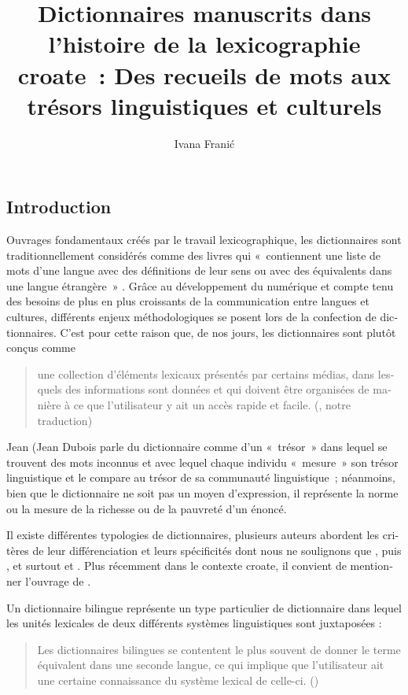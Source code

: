 \documentclass[output=paper,colorlinks,citecolor=brown,arabicfont,chinesefont,booklanguage=french]{langscibook}
\author{Ivana Franić \affiliation{University of Zagreb, Croatia }}
\title[Dictionnaires manuscrits dans l’histoire de la lexicographie croate]
      {Dictionnaires manuscrits dans l’histoire de la lexicographie croate~: Des recueils de mots aux trésors linguistiques et culturels}
\begin{document}
 
\begin{otherlanguage}{french}
\maketitle

\section{Introduction}
Ouvrages fondamentaux créés par le travail lexicographique, les dictionnaires sont traditionnellement considérés comme des livres qui «~contiennent une liste de mots d’une langue avec des définitions de leur sens ou avec des équivalents dans une langue étrangère~» \citep[10]{Samardzija2019}. Grâce au développement du numérique et compte tenu des besoins de plus en plus croissants de la communication entre langues et cultures, différents enjeux méthodologiques se posent lors de la confection de dictionnaires. C’est pour cette raison que, de nos jours, les dictionnaires sont plutôt conçus comme 

\begin{quote}
    une collection d’éléments lexicaux présentés par certains médias, dans lesquels des informations sont données et qui doivent être organisées de manière à ce que l’utilisateur y ait un accès rapide et facile. (\citealt[11]{Samardzija2019}, notre traduction)
\end{quote}

Jean (\citealt[44]{Dubois1970}Jean Dubois parle du dictionnaire comme d’un «~trésor~» dans lequel se trouvent des mots inconnus et avec lequel chaque individu «~mesure~» son trésor linguistique et le compare au trésor de sa communauté linguistique~; néanmoins, bien que le dictionnaire ne soit pas un moyen d’expression, il représente la norme ou la mesure de la richesse ou de la pauvreté d’un énoncé. 

Il existe différentes typologies de dictionnaires, plusieurs auteurs abordent les critères de leur différenciation et leurs spécificités dont nous ne soulignons que \citet{Zgusta1971}, puis \citet{Landau2001}, \citet{Dubois1970} et surtout \citet{Rey2008} et \citet{Pruvost2021}. Plus récemment dans le contexte croate, il convient de mentionner l’ouvrage de \citet{Samardzija2019}.

Un dictionnaire bilingue représente un type particulier de dictionnaire dans lequel les unités lexicales de deux différents systèmes linguistiques sont juxtaposées :

\begin{quote}
    Les dictionnaires bilingues se contentent le plus souvent de donner le terme équivalent dans une seconde langue, ce qui implique que l’utilisateur ait une certaine connaissance du système lexical de celle-ci. (\citealt[32]{Collignon1978})
\end{quote} 


\end{otherlanguage}
\end{document}
